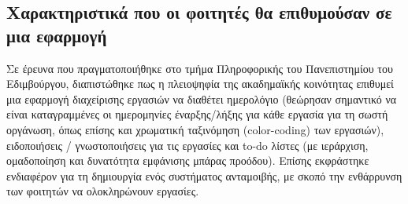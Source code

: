         \subsection{Χαρακτηριστικά που οι φοιτητές θα επιθυμούσαν σε μια εφαρμογή}
            Σε έρευνα \cite{Trujillo2020} που πραγματοποιήθηκε στο τμήμα Πληροφορικής του Πανεπιστημίου του Εδιμβούργου, διαπιστώθηκε πως η πλειοψηφία της ακαδημαϊκής κοινότητας επιθυμεί μια εφαρμογή διαχείρισης εργασιών να διαθέτει ημερολόγιο (θεώρησαν σημαντικό να είναι καταγραμμένες οι ημερομηνίες έναρξης/λήξης για κάθε εργασία για τη σωστή οργάνωση, όπως επίσης και χρωματική ταξινόμηση (color-coding) των εργασιών), ειδοποιήσεις / γνωστοποιήσεις για τις εργασίες και to-do λίστες (με ιεράρχιση, ομαδοποίηση και δυνατότητα εμφάνισης μπάρας προόδου). Επίσης εκφράστηκε ενδιαφέρον για τη δημιουργία ενός συστήματος ανταμοιβής, με σκοπό την ενθάρρυνση των φοιτητών να ολοκληρώνουν εργασίες.